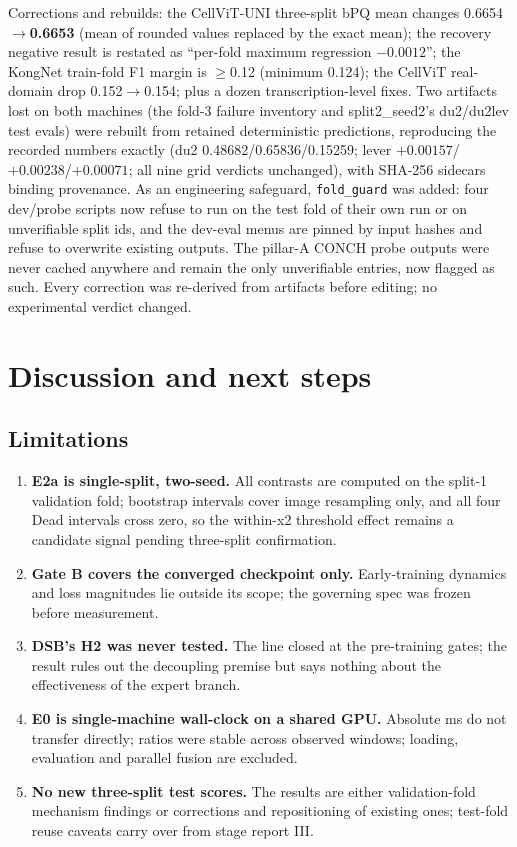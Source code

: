 \documentclass[11pt,a4paper]{article}
\newcommand{\code}[1]{\nolinkurl{#1}}
\begin{document}
Corrections and rebuilds: the CellViT-UNI three-split bPQ mean changes 0.6654$\to$\textbf{0.6653} (mean of rounded values replaced by the exact mean); the recovery negative result is restated as ``per-fold maximum regression $-0.0012$''; the KongNet train-fold F1 margin is $\geq$0.12 (minimum 0.124); the CellViT real-domain drop 0.152$\to$0.154; plus a dozen transcription-level fixes. Two artifacts lost on both machines (the fold-3 failure inventory and split2\_seed2's du2/du2lev test evals) were rebuilt from retained deterministic predictions, reproducing the recorded numbers exactly (du2 0.48682/0.65836/0.15259; lever $+0.00157$/$+0.00238$/$+0.00071$; all nine grid verdicts unchanged), with SHA-256 sidecars binding provenance. As an engineering safeguard, \code{fold\_guard} was added: four dev/probe scripts now refuse to run on the test fold of their own run or on unverifiable split ids, and the dev-eval menus are pinned by input hashes and refuse to overwrite existing outputs. The pillar-A CONCH probe outputs were never cached anywhere and remain the only unverifiable entries, now flagged as such. Every correction was re-derived from artifacts before editing; no experimental verdict changed.

\section{Discussion and next steps}

\subsection{Limitations}

\begin{enumerate}
\item \textbf{E2a is single-split, two-seed.} All contrasts are computed on the split-1 validation fold; bootstrap intervals cover image resampling only, and all four Dead intervals cross zero, so the within-x2 threshold effect remains a candidate signal pending three-split confirmation.
\item \textbf{Gate B covers the converged checkpoint only.} Early-training dynamics and loss magnitudes lie outside its scope; the governing spec was frozen before measurement.
\item \textbf{DSB's H2 was never tested.} The line closed at the pre-training gates; the result rules out the decoupling premise but says nothing about the effectiveness of the expert branch.
\item \textbf{E0 is single-machine wall-clock on a shared GPU.} Absolute ms do not transfer directly; ratios were stable across observed windows; loading, evaluation and parallel fusion are excluded.
\item \textbf{No new three-split test scores.} The results are either validation-fold mechanism findings or corrections and repositioning of existing ones; test-fold reuse caveats carry over from stage report III.
\end{enumerate}
\end{document}

